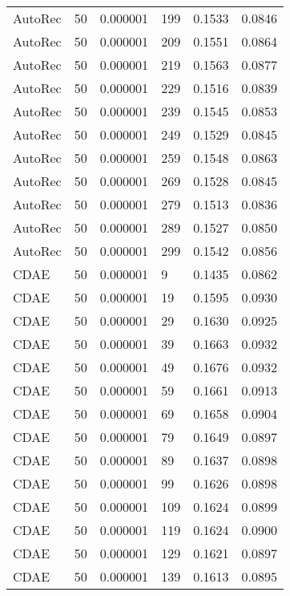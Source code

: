 \begin{tabular}{llrlrr}
 AutoRec &   50 &  0.000001 &   199 &  0.1533 &       0.0846 \\
 AutoRec &   50 &  0.000001 &   209 &  0.1551 &       0.0864 \\
 AutoRec &   50 &  0.000001 &   219 &  0.1563 &       0.0877 \\
 AutoRec &   50 &  0.000001 &   229 &  0.1516 &       0.0839 \\
 AutoRec &   50 &  0.000001 &   239 &  0.1545 &       0.0853 \\
 AutoRec &   50 &  0.000001 &   249 &  0.1529 &       0.0845 \\
 AutoRec &   50 &  0.000001 &   259 &  0.1548 &       0.0863 \\
 AutoRec &   50 &  0.000001 &   269 &  0.1528 &       0.0845 \\
 AutoRec &   50 &  0.000001 &   279 &  0.1513 &       0.0836 \\
 AutoRec &   50 &  0.000001 &   289 &  0.1527 &       0.0850 \\
 AutoRec &   50 &  0.000001 &   299 &  0.1542 &       0.0856 \\
    CDAE &   50 &  0.000001 &     9 &  0.1435 &       0.0862 \\
    CDAE &   50 &  0.000001 &    19 &  0.1595 &       0.0930 \\
    CDAE &   50 &  0.000001 &    29 &  0.1630 &       0.0925 \\
    CDAE &   50 &  0.000001 &    39 &  0.1663 &       0.0932 \\
    CDAE &   50 &  0.000001 &    49 &  0.1676 &       0.0932 \\
    CDAE &   50 &  0.000001 &    59 &  0.1661 &       0.0913 \\
    CDAE &   50 &  0.000001 &    69 &  0.1658 &       0.0904 \\
    CDAE &   50 &  0.000001 &    79 &  0.1649 &       0.0897 \\
    CDAE &   50 &  0.000001 &    89 &  0.1637 &       0.0898 \\
    CDAE &   50 &  0.000001 &    99 &  0.1626 &       0.0898 \\
    CDAE &   50 &  0.000001 &   109 &  0.1624 &       0.0899 \\
    CDAE &   50 &  0.000001 &   119 &  0.1624 &       0.0900 \\
    CDAE &   50 &  0.000001 &   129 &  0.1621 &       0.0897 \\
    CDAE &   50 &  0.000001 &   139 &  0.1613 &       0.0895 \\

\end{tabular}

